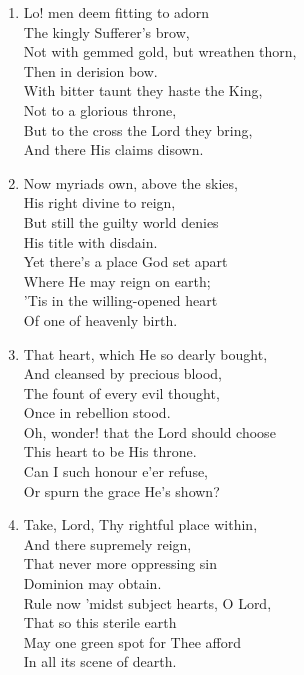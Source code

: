 \documentclass[11pt,a4paper]{article}
\begin{document}
\begin{enumerate}
    \item Lo! men deem fitting to adorn \\
        The kingly Sufferer's brow, \\
        Not with gemmed gold, but wreathen thorn, \\
        Then in derision bow. \\
        With bitter taunt they haste the King, \\
        Not to a glorious throne, \\
        But to the cross the Lord they bring, \\
        And there His claims disown.

    \item Now myriads own, above the skies, \\
        His right divine to reign, \\
        But still the guilty world denies \\
        His title with disdain. \\
        Yet there's a place God set apart \\
        Where He may reign on earth; \\
        'Tis in the willing-opened heart \\
        Of one of heavenly birth.

    \item That heart, which He so dearly bought, \\
        And cleansed by precious blood, \\
        The fount of every evil thought, \\
        Once in rebellion stood. \\
        Oh, wonder! that the Lord should choose \\
        This heart to be His throne. \\
        Can I such honour e'er refuse, \\
        Or spurn the grace He's shown?

    \item Take, Lord, Thy rightful place within, \\
        And there supremely reign, \\
        That never more oppressing sin \\
        Dominion may obtain. \\
        Rule now 'midst subject hearts, O Lord, \\
        That so this sterile earth \\
        May one green spot for Thee afford \\
        In all its scene of dearth.


\end{enumerate}
\end{document}
